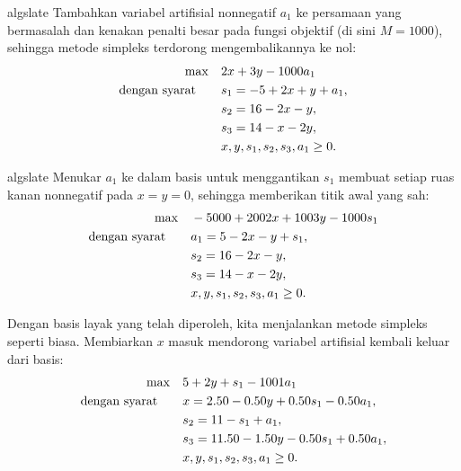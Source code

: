 \begin{steppanel}{algslate}
 Tambahkan variabel artifisial nonnegatif $a_1$ ke persamaan yang bermasalah dan kenakan penalti besar pada fungsi objektif (di sini $M=1000$), sehingga metode simpleks terdorong mengembalikannya ke nol:
\[
\begin{aligned}
\max\quad & 2x + 3y - 1000a_1 \\
\mbox{dengan syarat}\quad\quad & s_1 = -5 + 2x + y + a_1,\\
& s_2 = 16 - 2x - y,\\
& s_3 = 14 - x - 2y,\\
& x, y, s_1, s_2, s_3, a_1 \ge 0.
\end{aligned}
\]
\end{steppanel}

\begin{steppanel}{algslate}
 Menukar $a_1$ ke dalam basis untuk menggantikan $s_1$ membuat setiap ruas kanan nonnegatif pada $x=y=0$, sehingga memberikan titik awal yang sah:
\[
\begin{aligned}
\max\quad & -5000 + 2002x + 1003y - 1000s_1 \\
\mbox{dengan syarat}\quad\quad & a_1 = 5 - 2x - y + s_1,\\
& s_2 = 16 - 2x - y,\\
& s_3 = 14 - x - 2y,\\
& x, y, s_1, s_2, s_3, a_1 \ge 0.
\end{aligned}
\]
\end{steppanel}

Dengan basis layak yang telah diperoleh, kita menjalankan metode simpleks seperti biasa. Membiarkan $x$ masuk mendorong variabel artifisial kembali keluar dari basis:
\[
\begin{aligned}
\max\quad & 5 + 2y + s_1 - 1001a_1 \\
\mbox{dengan syarat}\quad\quad & x = 2.50 - 0.50y + 0.50s_1 - 0.50a_1,\\
& s_2 = 11 - s_1 + a_1,\\
& s_3 = 11.50 - 1.50y - 0.50s_1 + 0.50a_1,\\
& x, y, s_1, s_2, s_3, a_1 \ge 0.
\end{aligned}
\]

